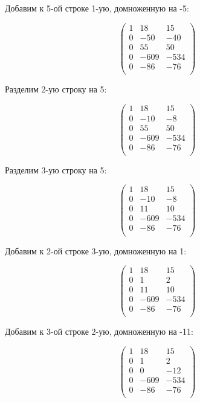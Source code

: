 	Добавим к 5-ой строке 1-ую, домноженную на -5:
	
	\[
	\begin{pmatrix}
	1 & 18 & 15 \\
	0 & -50 & -40 \\
	0 & 55 & 50 \\
	0 & -609 & -534 \\
	0 & -86 & -76 \\
	\end{pmatrix}
	\]
	
	Разделим 2-ую строку на 5:
	
	\[
	\begin{pmatrix}
	1 & 18 & 15 \\
	0 & -10 & -8 \\
	0 & 55 & 50 \\
	0 & -609 & -534 \\
	0 & -86 & -76 \\
	\end{pmatrix}
	\]
	
	Разделим 3-ую строку на 5:
	
	\[
	\begin{pmatrix}
	1 & 18 & 15 \\
	0 & -10 & -8 \\
	0 & 11 & 10 \\
	0 & -609 & -534 \\
	0 & -86 & -76 \\
	\end{pmatrix}
	\]
	
	Добавим к 2-ой строке 3-ую, домноженную на 1:
	
	\[
	\begin{pmatrix}
	1 & 18 & 15 \\
	0 & 1 & 2 \\
	0 & 11 & 10 \\
	0 & -609 & -534 \\
	0 & -86 & -76 \\
	\end{pmatrix}
	\]
	
	Добавим к 3-ой строке 2-ую, домноженную на -11:
	
	\[
	\begin{pmatrix}
	1 & 18 & 15 \\
	0 & 1 & 2 \\
	0 & 0 & -12 \\
	0 & -609 & -534 \\
	0 & -86 & -76 \\
	\end{pmatrix}
	\]
	

